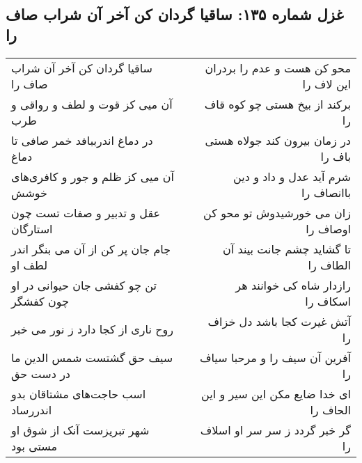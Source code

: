 \begin{center}
\section*{غزل شماره ۱۳۵: ساقیا گردان کن آخر آن شراب صاف را}
\label{sec:0135}
\begin{longtable}{l p{0.5cm} r}
ساقیا گردان کن آخر آن شراب صاف را
&&
محو کن هست و عدم را بردران این لاف را
\\
آن میی کز قوت و لطف و رواقی و طرب
&&
برکند از بیخ هستی چو کوه قاف را
\\
در دماغ اندرببافد خمر صافی تا دماغ
&&
در زمان بیرون کند جولاه هستی باف را
\\
آن میی کز ظلم و جور و کافری‌های خوشش
&&
شرم آید عدل و داد و دین باانصاف را
\\
عقل و تدبیر و صفات تست چون استارگان
&&
زان می خورشیدوش تو محو کن اوصاف را
\\
جام جان پر کن از آن می بنگر اندر لطف او
&&
تا گشاید چشم جانت بیند آن الطاف را
\\
تن چو کفشی جان حیوانی در او چون کفشگر
&&
رازدار شاه کی خوانند هر اسکاف را
\\
روح ناری از کجا دارد ز نور می خبر
&&
آتش غیرت کجا باشد دل خزاف را
\\
سیف حق گشتست شمس الدین ما در دست حق
&&
آفرین آن سیف را و مرحبا سیاف را
\\
اسب حاجت‌های مشتاقان بدو اندررساد
&&
ای خدا ضایع مکن این سیر و این الحاف را
\\
شهر تبریزست آنک از شوق او مستی بود
&&
گر خبر گردد ز سر سر او اسلاف را
\\
\end{longtable}
\end{center}
